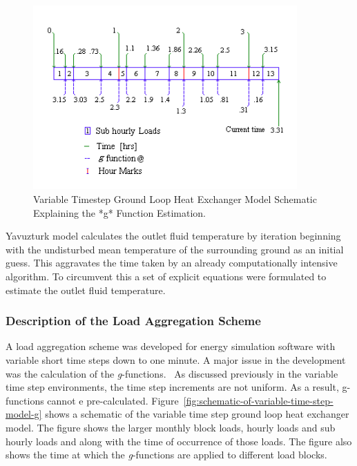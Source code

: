 \begin{figure}[hbtp] %
\centering
\includegraphics[width=0.9\textwidth, height=0.9\textheight, keepaspectratio=true]{media/image5655.png}
\caption{  Variable Timestep Ground Loop Heat Exchanger Model Schematic Explaining the *g* Function Estimation. \protect \label{fig:variable-timestep-ground-loop-heat-exchanger}}
\end{figure}

Yavuzturk model calculates the outlet fluid temperature by iteration beginning with the undisturbed mean temperature of the surrounding ground as an initial guess. This aggravates the time taken by an already computationally intensive algorithm. To circumvent this a set of explicit equations were formulated to estimate the outlet fluid temperature.

\subsubsection{Description of the Load Aggregation Scheme}\label{description-of-the-load-aggregation-scheme}

A load aggregation scheme was developed for energy simulation software with variable short time steps down to one minute. A major issue in the development was the calculation of the \emph{g}-functions.~ As discussed previously in the variable time step environments, the time step increments are not uniform. As a result, g-functions cannot e pre-calculated. Figure~\ref{fig:schematic-of-variable-time-step-model-g} shows a schematic of the variable time step ground loop heat exchanger model. The figure shows the larger monthly block loads, hourly loads and sub hourly loads and along with the time of occurrence of those loads. The figure also shows the time at which the \emph{g}-functions are applied to different load blocks.

